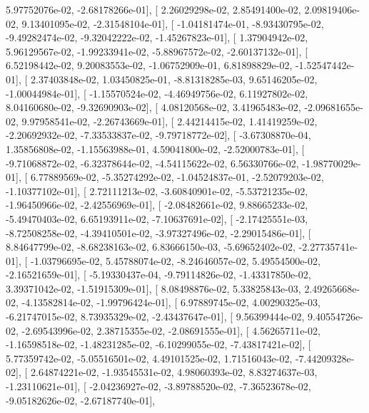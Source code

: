 \documentclass{article}
\begin{document}
          5.97752076e-02,  -2.68178266e-01],
       [  2.26029298e-02,   2.85491400e-02,   2.09819406e-02,
          9.13401095e-02,  -2.31548104e-01],
       [ -1.04181474e-01,  -8.93430795e-02,  -9.49282474e-02,
         -9.32042222e-02,  -1.45267823e-01],
       [  1.37904942e-02,   5.96129567e-02,  -1.99233941e-02,
         -5.88967572e-02,  -2.60137132e-01],
       [  6.52198442e-02,   9.20083553e-02,  -1.06752909e-01,
          6.81898829e-02,  -1.52547442e-01],
       [  2.37403848e-02,   1.03450825e-01,  -8.81318285e-03,
          9.65146205e-02,  -1.00044984e-01],
       [ -1.15570524e-02,  -4.46949756e-02,   6.11927802e-02,
          8.04160680e-02,  -9.32690903e-02],
       [  4.08120568e-02,   3.41965483e-02,  -2.09681655e-02,
          9.97958541e-02,  -2.26743669e-01],
       [  2.44214415e-02,   1.41419259e-02,  -2.20692932e-02,
         -7.33533837e-02,  -9.79718772e-02],
       [ -3.67308870e-04,   1.35856808e-02,  -1.15563988e-01,
          4.59041800e-02,  -2.52000783e-01],
       [ -9.71068872e-02,  -6.32378644e-02,  -4.54115622e-02,
          6.56330766e-02,  -1.98770029e-01],
       [  6.77889569e-02,  -5.35274292e-02,  -1.04524837e-01,
         -2.52079203e-02,  -1.10377102e-01],
       [  2.72111213e-02,  -3.60840901e-02,  -5.53721235e-02,
         -1.96450966e-02,  -2.42556969e-01],
       [ -2.08482661e-02,   9.88665233e-02,  -5.49470403e-02,
          6.65193911e-02,  -7.10637691e-02],
       [ -2.17425551e-03,  -8.72508258e-02,  -4.39410501e-02,
         -3.97327496e-02,  -2.29015486e-01],
       [  8.84647799e-02,  -8.68238163e-02,   6.83666150e-03,
         -5.69652402e-02,  -2.27735741e-01],
       [ -1.03796695e-02,   5.45788074e-02,  -8.24646057e-02,
          5.49554500e-02,  -2.16521659e-01],
       [ -5.19330437e-04,  -9.79114826e-02,  -1.43317850e-02,
          3.39371042e-02,  -1.51915309e-01],
       [  8.08498876e-02,   5.33825843e-03,   2.49265668e-02,
         -4.13582814e-02,  -1.99796424e-01],
       [  6.97889745e-02,   4.00290325e-03,  -6.21747015e-02,
          8.73935329e-02,  -2.43437647e-01],
       [  9.56399444e-02,   9.40554726e-02,  -2.69543996e-02,
          2.38715355e-02,  -2.08691555e-01],
       [  4.56265711e-02,  -1.16598518e-02,  -1.48231285e-02,
         -6.10299055e-02,  -7.43817421e-02],
       [  5.77359742e-02,  -5.05516501e-02,   4.49101525e-02,
          1.71516043e-02,  -7.44209328e-02],
       [  2.64874221e-02,  -1.93545531e-02,   4.98060393e-02,
          8.83274637e-03,  -1.23110621e-01],
       [ -2.04236927e-02,  -3.89788520e-02,  -7.36523678e-02,
         -9.05182626e-02,  -2.67187740e-01],
\end{document}
